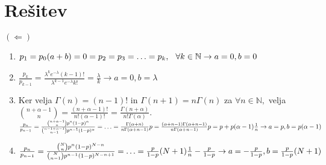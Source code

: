 \documentclass[a4paper]{article}
\begin{document}
\section{Rešitev}
$(\Leftarrow)$
\begin{enumerate}
	\item{$p_1=p_0(a + b) = 0 = p_2 = p_3 = \ldots = p_k, \hspace{0.25cm} \forall k \in \mathbb{N} \rightarrow a=0, b=0$}
	\item{$\frac{p_k}{p_{k-1}}=\frac{\lambda^k e^{-\lambda}(k-1)!}{\lambda^{k-1} e^{-\lambda}k!} = \frac{\lambda}{k} \rightarrow a = 0, b = \lambda$} 
	\item{Ker velja $\Gamma(n)=(n-1)!$ in $\Gamma(n+1)=n\Gamma(n)$ za $\forall n \in \mathbb{N},$ velja \\[1.5mm] ${n +\alpha - 1 \choose n} = \frac{(n+\alpha-1)!}{n!(\alpha-1)!}=\frac{\Gamma(n+\alpha)}{n!\Gamma(\alpha)}.$ \\[1.5mm] $\frac{p_n}{p_{n-1}}=\frac{\binom{n + \alpha - 1}{n}p^n(1-p)^{\alpha}}{\binom{n-1+\alpha-1}{n-1}p^{n-1}(1-p)^\alpha}=\ldots=\frac{\Gamma(\alpha+n)}{n\Gamma(\alpha+n-1)}p=\frac{(\alpha+n-1)\Gamma(\alpha+n-1)}{n\Gamma(\alpha+n-1)}p= \\[1.5mm] p+p(\alpha-1)\frac{1}{n} \rightarrow a=p, b=p(\alpha-1)$}
	\item{$\frac{p_n}{p_{n-1}}=\frac{\binom{N}{n}p^n(1-p)^{N-n}}{\binom{N}{n-1}p^{n-1}(1-p)^{N-n+1}}=\ldots=\frac{p}{1-p}(N+1)\frac{1}{n}-\frac{p}{1-p} \rightarrow a=-\frac{p}{1-p}, b = \\[1.5mm] \frac{p}{1-p}(N+1)$}
\end{enumerate}
\end{document}
